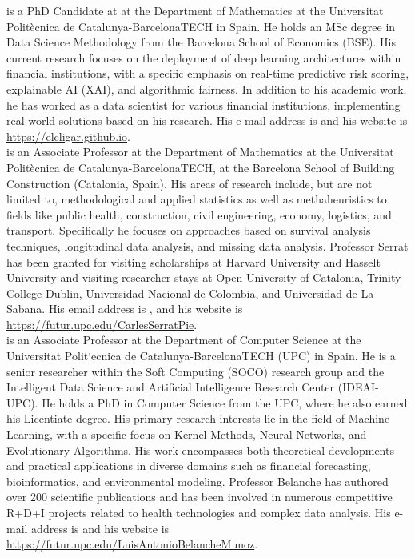 \documentclass{wscpaperproc}
\theoremstyle{wsc}
\begin{document}
 is a PhD Candidate at at the Department of Mathematics at the Universitat Polit\`ecnica de Catalunya-BarcelonaTECH in Spain. He holds an MSc degree in Data Science Methodology from the Barcelona School of Economics (BSE). His current research focuses on the deployment of deep learning architectures within financial institutions, with a specific emphasis on real-time predictive risk scoring, explainable AI (XAI), and algorithmic fairness. In addition to his academic work, he has worked as a data scientist for various financial institutions, implementing real-world solutions based on his research. His e-mail address is  and his website is \url{https://elcligar.github.io}.\\


 is an Associate Professor at the Department of Mathematics at the Universitat Polit\`ecnica de Catalunya-BarcelonaTECH, at the Barcelona School of Building Construction (Catalonia, Spain). His areas of research include, but are not limited to, methodological and applied statistics as well as methaheuristics to fields like public health, construction, civil engineering, economy, logistics, and transport. Specifically he focuses on approaches based on survival analysis techniques, longitudinal data analysis, and missing data analysis. Professor Serrat has been granted for visiting scholarships at Harvard University and Hasselt University and visiting researcher stays at Open University of Catalonia, Trinity College Dublin, Universidad Nacional de Colombia, and Universidad de La Sabana. His email address is , and his website is \url{https://futur.upc.edu/CarlesSerratPie}.\\

 is an Associate Professor at the Department of Computer Science at the Universitat Polit`ecnica de Catalunya-BarcelonaTECH (UPC) in Spain. He is a senior researcher within the Soft Computing (SOCO) research group and the Intelligent Data Science and Artificial Intelligence Research Center (IDEAI-UPC). He holds a PhD in Computer Science from the UPC, where he also earned his Licentiate degree. His primary research interests lie in the field of Machine Learning, with a specific focus on Kernel Methods, Neural Networks, and Evolutionary Algorithms. His work encompasses both theoretical developments and practical applications in diverse domains such as financial forecasting, bioinformatics, and environmental modeling. Professor Belanche has authored over 200 scientific publications and has been involved in numerous competitive R+D+I projects related to health technologies and complex data analysis. His e-mail address is  and his website is \url{https://futur.upc.edu/LuisAntonioBelancheMunoz}.\\
\end{document}
